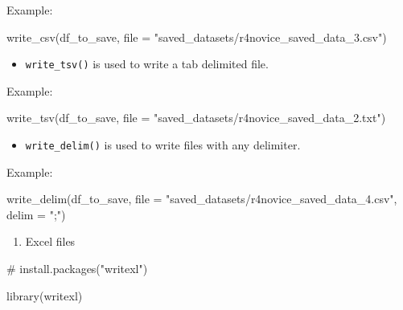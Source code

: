 \documentclass[
  letterpaper,
  DIV=11,
  numbers=noendperiod]{scrreprt}
\newenvironment{Shaded}{}{}
\newcommand{\AttributeTok}[1]{\textcolor[rgb]{0.84,0.23,0.29}{#1}}
\newcommand{\CommentTok}[1]{\textcolor[rgb]{0.42,0.45,0.49}{#1}}
\newcommand{\FunctionTok}[1]{\textcolor[rgb]{0.44,0.26,0.76}{#1}}
\newcommand{\NormalTok}[1]{\textcolor[rgb]{0.14,0.16,0.18}{#1}}
\newcommand{\StringTok}[1]{\textcolor[rgb]{0.01,0.18,0.38}{#1}}
\providecommand{\tightlist}{%
  \setlength{\itemsep}{0pt}\setlength{\parskip}{0pt}}\usepackage{longtable,booktabs,array}
\begin{document}
Example:

\begin{Shaded}
\begin{Highlighting}[]
\FunctionTok{write\_csv}\NormalTok{(df\_to\_save, }\AttributeTok{file =} \StringTok{"saved\_datasets/r4novice\_saved\_data\_3.csv"}\NormalTok{)}
\end{Highlighting}
\end{Shaded}

\begin{itemize}
\tightlist
\item
  \texttt{write\_tsv()} is used to write a tab delimited file.
\end{itemize}

Example:

\begin{Shaded}
\begin{Highlighting}[]
\FunctionTok{write\_tsv}\NormalTok{(df\_to\_save, }\AttributeTok{file =} \StringTok{"saved\_datasets/r4novice\_saved\_data\_2.txt"}\NormalTok{)}
\end{Highlighting}
\end{Shaded}

\begin{itemize}
\tightlist
\item
  \texttt{write\_delim()} is used to write files with any delimiter.
\end{itemize}

Example:

\begin{Shaded}
\begin{Highlighting}[]
\FunctionTok{write\_delim}\NormalTok{(df\_to\_save, }\AttributeTok{file =} \StringTok{"saved\_datasets/r4novice\_saved\_data\_4.csv"}\NormalTok{, }\AttributeTok{delim =} \StringTok{";"}\NormalTok{)}
\end{Highlighting}
\end{Shaded}

\begin{enumerate}
\def\labelenumi{\alph{enumi}.}
\setcounter{enumi}{1}
\tightlist
\item
  Excel files
\end{enumerate}

\begin{Shaded}
\begin{Highlighting}[]
\CommentTok{\# install.packages("writexl")}
\end{Highlighting}
\end{Shaded}

\begin{Shaded}
\begin{Highlighting}[]
\FunctionTok{library}\NormalTok{(writexl)}
\end{Highlighting}
\end{Shaded}
\end{document}
